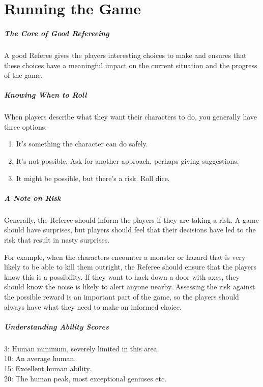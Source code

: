 \documentclass[itdr/core]{subfiles}
\begin{document}

\chapter{Running the Game}
\label{ch:running_the_game}

\paragraph{The Core of Good Refereeing}
A good Referee gives the players interesting choices to make and ensures that these choices have a meaningful impact on the current situation and the progress of the game.


\paragraph{Knowing When to Roll}
When players describe what they want their characters to do, you generally have three options:
\begin{enumerate}
	\item It's something the character can do safely.
	\item It's not possible. Ask for another approach, \mbox{perhaps} giving suggestions.
	\item It might be possible, but there's a risk. Roll dice.
\end{enumerate}


\paragraph{A Note on Risk}
Generally, the Referee should inform the players if they are taking a risk. A game should have surprises, but players should feel that their decisions have led to the risk that result in nasty surprises.

For example, when the characters encounter a monster or hazard that is very likely to be able to kill them outright, the Referee should ensure that the players know this is a possibility. If they want to hack down a door with axes, they should know the noise is likely to alert anyone nearby. Assessing the risk against the possible reward is an important part of the game, so the players should always have what they need to make an informed choice.


\paragraph{Understanding Ability Scores}
3: Human minimum, severely limited in this area.\\
10: An average human.\\
15: Excellent human ability.\\
20: The human peak, most exceptional geniuses etc.
\end{document}
